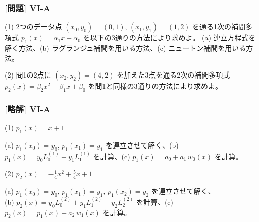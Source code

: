 \documentclass[dvipdfmx,aspectratio=169,20pt]{beamer}
\newcommand{\myfontsetting}[3]{{\fontsize{#1}{#2}\selectfont #3}}
\begin{document}
\begin{frame}
\frametitle{[問題] V\hspace{-.1em}I-A}

\myfontsetting{18pt}{20pt}{
(1) 2つのデータ点 $(x_0,y_0)=(0,1)$, $(x_1,y_1)=(1,2)$ を通る1次の補間多項式 $p_1(x)=\alpha_1 x + \alpha_0$ を以下の3通りの方法により求めよ。
(a) 連立方程式を解く方法、(b) ラグランジュ補間を用いる方法、(c) ニュートン補間を用いる方法。%

\vspace{3mm}

\noindent %
(2) 問1の2点に $(x_2,y_2)=(4,2)$ を加えた3点を通る2次の補間多項式 $p_2(x)=\beta_2 x^2 + \beta_1 x + \beta_0$ を問1と同様の3通りの方法により求めよ。
}
\end{frame}
\begin{frame}
\frametitle{[略解] V\hspace{-.1em}I-A}

\myfontsetting{18pt}{18pt}{ (1) $p_1(x) = x + 1$}

\vspace{2mm}

\myfontsetting{12pt}{12pt}{ 
(a) $p_1(x_0) = y_0$,  $p_1(x_1) = y_1$ を連立させて解く、(b) $p_1(x) = y_0 L^{(1)}_0 + y_1 L^{(1)}_1$ を計算、(c) $p_1(x)=a_0+a_1\,w_0(x)$ を計算。
}

\vspace{5mm}

\myfontsetting{18pt}{18pt}{ (2) $p_2(x) = - \frac{1}{4} x^2 + \frac{5}{4} x + 1$}

\vspace{4mm}

\myfontsetting{12pt}{12pt}{ 
(a) $p_1(x_0) = y_0$,  $p_1(x_1) = y_1$, $p_1(x_2) = y_2$ を連立させて解く、\\
(b) $p_2(x) = y_0 L^{(2)}_0 + y_1 L^{(2)}_1 + y_2 L^{(2)}_2$ を計算、(c) $p_2(x)=p_1(x)+a_2\,w_1(x)$ を計算。
}

\end{frame}
\end{document}
